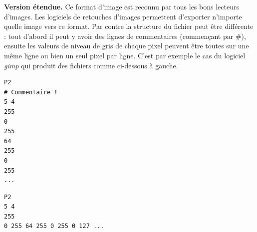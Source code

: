 \documentclass[11pt,class=report,crop=false]{standalone}
\begin{document}
\begin{cours}
\bigskip

\textbf{Version étendue.}	
Ce format d'image est reconnu par tous les bons lecteurs d'images. Les logiciels de retouches d'images permettent d'exporter n'importe quelle image vers ce format. Par contre la structure du fichier peut être différente : tout d'abord il peut y avoir des lignes de commentaires (commençant par \#), ensuite les valeurs de niveau de gris de chaque pixel peuvent être toutes sur une même ligne ou bien un seul pixel par ligne.
C'est par exemple le cas du logiciel \emph{gimp} qui produit des fichiers comme ci-dessous à gauche.

\begin{center}
\begin{minipage}{0.4\textwidth}
\begin{lstlisting}
P2
# Commentaire !
5 4
255
0
255
64
255
0
255
...
\end{lstlisting}
\end{minipage}	
\begin{minipage}{0.4\textwidth}
\begin{lstlisting}
P2
5 4
255
0 255 64 255 0 255 0 127 ...
\end{lstlisting}
\end{minipage}
\end{center}

\end{cours}


\end{document}
